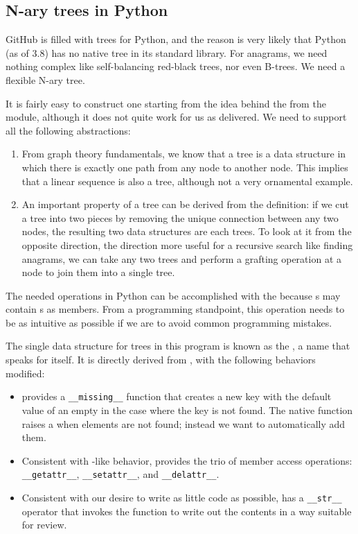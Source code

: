 \documentclass[letterpaper, 11pt]{article}
\begin{document}
\subsection*{N-ary trees in Python}

GitHub is filled with trees for Python, and the reason is very
likely that Python (as of 3.8) has no native tree in its standard
library.  For anagrams, we need nothing complex like self-balancing
red-black trees, nor even B-trees. We need a flexible N-ary tree.

It is fairly easy to construct one starting from the idea behind
the  from the  module, although
it does not quite work for us as delivered. We need to support all
the following abstractions:

\begin{enumerate}
\item From graph theory fundamentals, we know that a tree is a data
structure in which there is exactly one path from any node to another
node. This implies that a linear sequence is also a tree, although
not a very ornamental example.

\item An important property of a tree can be derived from the
definition: if we cut a tree into two pieces by removing the unique
connection between any two nodes, the resulting two data structures
are each trees. To look at it from the opposite direction, the
direction more useful for a recursive search like finding anagrams,
we can take any two trees and perform a grafting operation at a
node to join them into a single tree.

\end{enumerate}

The needed operations in Python can be accomplished with the
 because s may contain s as members.
From a programming standpoint, this operation needs to be as intuitive
as possible if we are to avoid common programming mistakes.

The single data structure for trees in this program is known as 
the , a name that speaks for itself. It is directly
derived from , with the following behaviors modified:

\begin{itemize}
\item {} provides a \verb|__missing__| function that
creates a new key with the default value of an empty  in
the case where the key is not found. The native  function
raises a  when elements are not found; instead we want to
automatically add them.

\item Consistent with -like behavior,  provides
the trio of member access operations: \verb|__getattr__|, \verb|__setattr__|,
and \verb|__delattr__|. 

\item Consistent with our desire to write as little code as possible, 
 has a \verb|__str__| operator that invokes the 
function to write out the contents in a way suitable for review.

\end{itemize}
\end{document}
